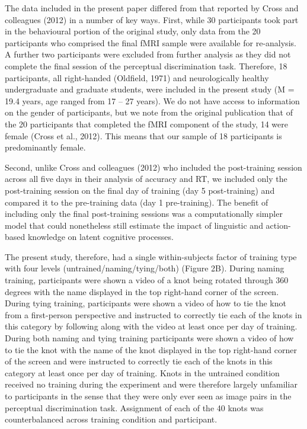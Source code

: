 \documentclass[
  english,
  man, donotrepeattitle,floatsintext]{apa6}
\begin{document}
The data included in the present paper differed from that reported by Cross and colleagues (2012) in a number of key ways. First, while 30 participants took part in the behavioural portion of the original study, only data from the 20 participants who comprised the final fMRI sample were available for re-analysis. A further two participants were excluded from further analysis as they did not complete the final session of the perceptual discrimination task. Therefore, 18 participants, all right-handed (Oldfield, 1971) and neurologically healthy undergraduate and graduate students, were included in the present study (M = 19.4 years, age ranged from 17 -- 27 years). We do not have access to information on the gender of participants, but we note from the original publication that of the 20 participants that completed the fMRI component of the study, 14 were female (Cross et al., 2012). This means that our sample of 18 participants is predominantly female.

Second, unlike Cross and colleagues (2012) who included the post-training session across all five days in their analysis of accuracy and RT, we included only the post-training session on the final day of training (day 5 post-training) and compared it to the pre-training data (day 1 pre-training). The benefit of including only the final post-training sessions was a computationally simpler model that could nonetheless still estimate the impact of linguistic and action-based knowledge on latent cognitive processes.

The present study, therefore, had a single within-subjects factor of training type with four levels (untrained/naming/tying/both) (Figure 2B). During naming training, participants were shown a video of a knot being rotated through 360 degrees with the name displayed in the top right-hand corner of the screen. During tying training, participants were shown a video of how to tie the knot from a first-person perspective and instructed to correctly tie each of the knots in this category by following along with the video at least once per day of training. During both naming and tying training participants were shown a video of how to tie the knot with the name of the knot displayed in the top right-hand corner of the screen and were instructed to correctly tie each of the knots in this category at least once per day of training. Knots in the untrained condition received no training during the experiment and were therefore largely unfamiliar to participants in the sense that they were only ever seen as image pairs in the perceptual discrimination task. Assignment of each of the 40 knots was counterbalanced across training condition and participant.
\end{document}

